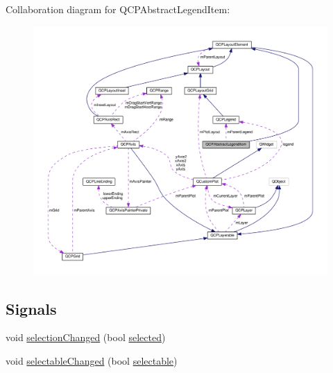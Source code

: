 Collaboration diagram for Q\+C\+P\+Abstract\+Legend\+Item\+:\nopagebreak
\begin{figure}[H]
\begin{center}
\leavevmode
\includegraphics[width=350pt]{classQCPAbstractLegendItem__coll__graph}
\end{center}
\end{figure}
\subsection*{Signals}
\begin{DoxyCompactItemize}
\item 
void \hyperlink{classQCPAbstractLegendItem_a7cb61fdfbaf69c590bacb8f9e7099d9e}{selection\+Changed} (bool \hyperlink{classQCPAbstractLegendItem_ac776e68e3367704452131c6aa9908bb9}{selected})
\item 
void \hyperlink{classQCPAbstractLegendItem_abc4d779b938cc9235f9196737dbaa6bd}{selectable\+Changed} (bool \hyperlink{classQCPAbstractLegendItem_a0a0205f33f37edae50826c24cb8f1983}{selectable})
\end{DoxyCompactItemize}
